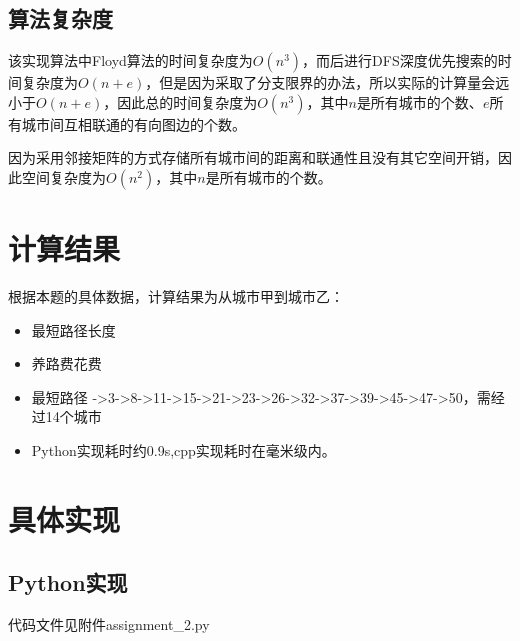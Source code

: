 \documentclass[a4paper,12pt]{article}
\begin{document}
\subsection{算法复杂度}
该实现算法中Floyd算法的时间复杂度为$O(n^3)$，而后进行DFS深度优先搜索的时间复杂度为$O(n+e)$，但是因为采取了分支限界的办法，所以实际的计算量会远小于$O(n+e)$，因此总的时间复杂度为{\color{red}$O(n^3)$}，其中$n$是所有城市的个数、$e$所有城市间互相联通的有向图边的个数。

因为采用邻接矩阵的方式存储所有城市间的距离和联通性且没有其它空间开销，因此空间复杂度为{\color{red}$O(n^2)$}，其中$n$是所有城市的个数。

\section{计算结果}
根据本题的具体数据，计算结果为从城市甲到城市乙：
\begin{itemize}
    \item 最短路径长度 
    \item 养路费花费 
    \item 最短路径 ->3->8->11->15->21->23->26->32->37->39->45->47->50，需经过14个城市
    \item Python实现耗时约0.9s,cpp实现耗时在毫米级内。
\end{itemize}

\section{具体实现}
\subsection{Python实现}
代码文件见附件assignment\_2.py
\end{document}
